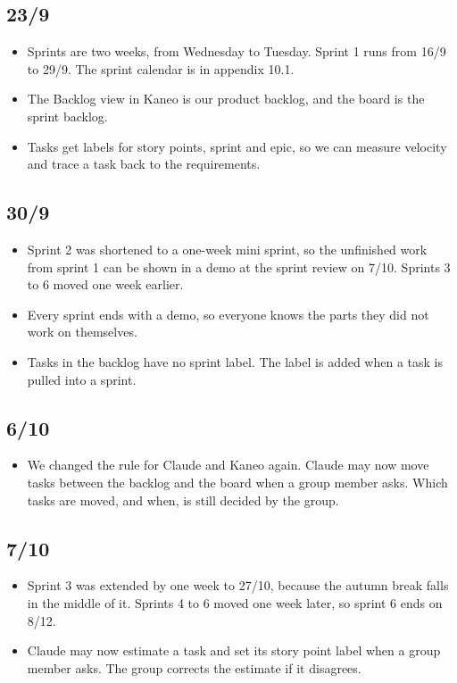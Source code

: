 \documentclass[a4paper,11pt]{article}
\begin{document}
\subsection*{23/9}
\begin{itemize}
    \item Sprints are two weeks, from Wednesday to Tuesday. Sprint 1 runs from 16/9 to 29/9. The sprint calendar is in appendix 10.1.
    \item The Backlog view in Kaneo is our product backlog, and the board is the sprint backlog.
    \item Tasks get labels for story points, sprint and epic, so we can measure velocity and trace a task back to the requirements.
\end{itemize}

\subsection*{30/9}
\begin{itemize}
    \item Sprint 2 was shortened to a one-week mini sprint, so the unfinished work from sprint 1 can be shown in a demo at the sprint review on 7/10. Sprints 3 to 6 moved one week earlier.
    \item Every sprint ends with a demo, so everyone knows the parts they did not work on themselves.
    \item Tasks in the backlog have no sprint label. The label is added when a task is pulled into a sprint.
\end{itemize}

\subsection*{6/10}
\begin{itemize}
    \item We changed the rule for Claude and Kaneo again. Claude may now move tasks between the backlog and the board when a group member asks. Which tasks are moved, and when, is still decided by the group.
\end{itemize}

\subsection*{7/10}
\begin{itemize}
    \item Sprint 3 was extended by one week to 27/10, because the autumn break falls in the middle of it. Sprints 4 to 6 moved one week later, so sprint 6 ends on 8/12.
    \item Claude may now estimate a task and set its story point label when a group member asks. The group corrects the estimate if it disagrees.
\end{itemize}
\end{document}
